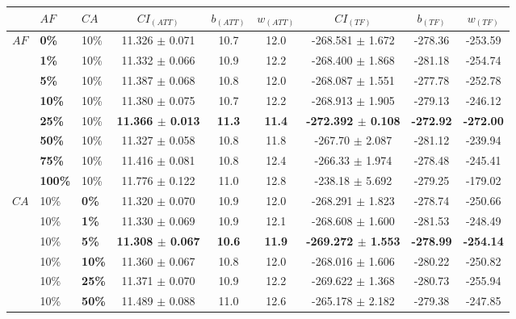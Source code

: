 \begin{sidewaystable}
    \begin{tabular}{|l|l|l||c|c|c|c|c|c|}
    \hline
    ~ & $AF$ & $CA$ & $CI_{(ATT)}$ & $b_{(ATT)}$ & $w_{(ATT)}$ & $CI_{(TF)}$ & $b_{(TF)}$ & $w_{(TF)}$ \\
    \hline
    $AF$ & \textbf{0\%} & 10\% & 11.326 $\pm$ 0.071 & 10.7 & 12.0 & -268.581 $\pm$ 1.672 & -278.36 & -253.59\\ 
    ~ & \textbf{1\%} & 10\% & 11.332 $\pm$ 0.066 & 10.9 & 12.2 & -268.400 $\pm$ 1.868  & -281.18 & -254.74 \\
    ~ & \textbf{5\%} & 10\% & 11.387 $\pm$ 0.068 & 10.8 & 12.0 & -268.087 $\pm$ 1.551 & -277.78 & -252.78 \\ 
    ~ & \textbf{10\%} & 10\% & 11.380 $\pm$ 0.075 & 10.7 & 12.2 & -268.913 $\pm$ 1.905 & -279.13 & -246.12 \\ 
    ~ & \textbf{25\%} & 10\% & \textbf{11.366 $\pm$ 0.013} & \textbf{11.3} & \textbf{11.4} & \textbf{-272.392 $\pm$ 0.108} & \textbf{-272.92} & \textbf{-272.00}\\
    ~ & \textbf{50\%} & 10\% & 11.327 $\pm$ 0.058 & 10.8 & 11.8 & -267.70 $\pm$ 2.087 & -281.12& -239.94 \\ 
    ~ & \textbf{75\%} & 10\% & 11.416 $\pm$ 0.081 & 10.8 & 12.4 & -266.33 $\pm$ 1.974 & -278.48 & -245.41 \\ 
    ~ & \textbf{100\%} & 10\% & 11.776 $\pm$ 0.122 & 11.0 & 12.8 & -238.18 $\pm$ 5.692& -279.25 & -179.02 \\ 
    \hline
    $CA$ & 10\% &\textbf{0\%} & 11.320 $\pm$ 0.070 & 10.9 & 12.0 & -268.291 $\pm$ 1.823 & -278.74 & -250.66 \\
    ~ & 10\% &\textbf{1\%} & 11.330 $\pm$ 0.069 & 10.9 & 12.1 & -268.608 $\pm$ 1.600 & -281.53 & -248.49 \\
    ~ & 10\% &\textbf{5\%} & \textbf{11.308 $\pm$ 0.067} & \textbf{10.6} & \textbf{11.9} & \textbf{-269.272 $\pm$ 1.553} & \textbf{-278.99} & \textbf{-254.14} \\
    ~ & 10\% &\textbf{10\%} & 11.360 $\pm$ 0.067 & 10.8 & 12.0 & -268.016 $\pm$ 1.606 & -280.22 & -250.82 \\
    ~ & 10\% &\textbf{25\%} & 11.371 $\pm$ 0.070 & 10.9 & 12.2 & -269.622 $\pm$ 1.368 & -280.73 & -255.94 \\
    ~ & 10\% &\textbf{50\%} & 11.489 $\pm$ 0.088 & 11.0 & 12.6 & -265.178 $\pm$ 2.182 & -279.38 & -247.85 \\

\end{tabular}
\end{sidewaystable}
